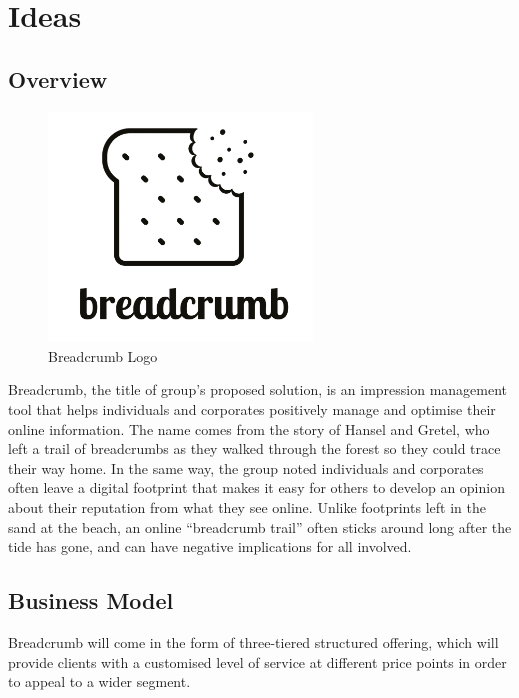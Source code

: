 \section{Ideas}

\subsection{Overview}

\begin{figure}
  \centering
  \begin{minipage}{7cm}
    \centering
    \includegraphics[width=7cm]{inc/breadcrumb_logo.png}
    \caption{Breadcrumb Logo}
    \label{fig:breadcrumbLogo}
  \end{minipage}
\end{figure}

Breadcrumb, the title of group's proposed solution, is an impression management tool that helps individuals and corporates positively manage and optimise their online information. The name comes from the story of Hansel and Gretel, who left a trail of breadcrumbs as they walked through the forest so they could trace their way home. In the same way, the group noted individuals and corporates often leave a digital footprint that makes it easy for others to develop an opinion about their reputation from what they see online. Unlike footprints left in the sand at the beach, an online ``breadcrumb trail'' often sticks around long after the tide has gone, and can have negative implications for all involved.

\subsection{Business Model}

Breadcrumb will come in the form of three-tiered structured offering, which will provide clients with a customised level of service at different price points in order to appeal to a wider segment.

